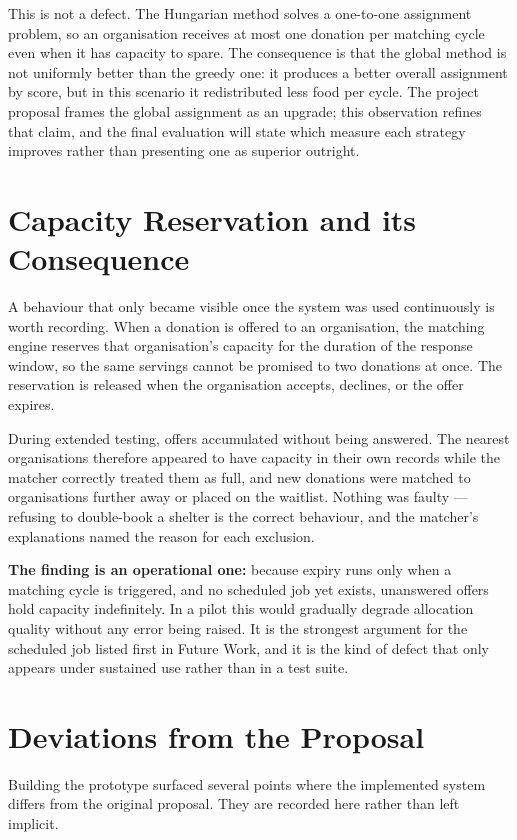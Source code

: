 \documentclass[12pt,a4paper]{report}
\begin{document}
This is not a defect. The Hungarian method solves a one-to-one assignment problem, so an organisation receives at most one donation per matching cycle even when it has capacity to spare. The consequence is that the global method is not uniformly better than the greedy one: it produces a better overall assignment by score, but in this scenario it redistributed less food per cycle. The project proposal frames the global assignment as an upgrade; this observation refines that claim, and the final evaluation will state which measure each strategy improves rather than presenting one as superior outright.

\section{Capacity Reservation and its Consequence}

A behaviour that only became visible once the system was used continuously is worth recording. When a donation is offered to an organisation, the matching engine reserves that organisation's capacity for the duration of the response window, so the same servings cannot be promised to two donations at once. The reservation is released when the organisation accepts, declines, or the offer expires.

During extended testing, offers accumulated without being answered. The nearest organisations therefore appeared to have capacity in their own records while the matcher correctly treated them as full, and new donations were matched to organisations further away or placed on the waitlist. Nothing was faulty --- refusing to double-book a shelter is the correct behaviour, and the matcher's explanations named the reason for each exclusion.

\textbf{The finding is an operational one:} because expiry runs only when a matching cycle is triggered, and no scheduled job yet exists, unanswered offers hold capacity indefinitely. In a pilot this would gradually degrade allocation quality without any error being raised. It is the strongest argument for the scheduled job listed first in Future Work, and it is the kind of defect that only appears under sustained use rather than in a test suite.

\section{Deviations from the Proposal}

Building the prototype surfaced several points where the implemented system differs from the original proposal. They are recorded here rather than left implicit.
\end{document}
